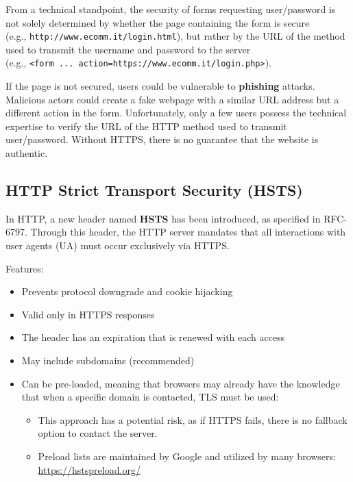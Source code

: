 From a technical standpoint, the security of forms requesting user/password is not solely determined by whether the page containing the form is secure \\
(e.g., \texttt{http://www.ecomm.it/login.html}), 
but rather by the URL of the method used to transmit the username and password to the server \\
(e.g., \texttt{<form ... action=http\emph{s}://www.ecomm.it/login.php>}).

If the page is not secured, users could be vulnerable to \textbf{phishing} attacks. Malicious actors could create a fake webpage with a similar URL address but a different action in the form. Unfortunately, only a few users possess the technical expertise to verify the URL of the HTTP method used to transmit user/password. Without HTTPS, there is no guarantee that the website is authentic.


\subsection{HTTP Strict Transport Security (HSTS)}

In HTTP, a new header named \textbf{HSTS} has been introduced, as specified in RFC-6797. Through this header, the HTTP server mandates that all interactions with user agents (UA) must occur exclusively via HTTPS.

Features:
\begin{itemize}
    \item Prevents protocol downgrade and cookie hijacking
    \item Valid only in HTTPS responses
    \item The header has an expiration that is renewed with each access
    \item May include subdomains (recommended)
    \item Can be pre-loaded, meaning that browsers may already have the knowledge that when a specific domain is contacted, TLS must be used:
    \begin{itemize}
        \item This approach has a potential risk, as if HTTPS fails, there is no fallback option to contact the server.
        \item Preload lists are maintained by Google and utilized by many browsers: \url{https://hstspreload.org/}
    \end{itemize}
\end{itemize}



